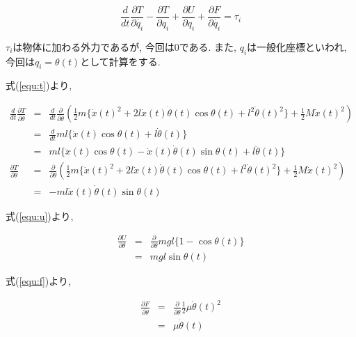 \documentclass[titlepage]{jsarticle}
\begin{document}
        \begin{equation}
            \frac{d}{dt}\frac{\partial T}{\partial \dot{q_i}} - \frac{\partial T}{\partial q_i} + \frac{\partial U}{\partial q_i} + \frac{\partial F}{\partial \dot{q_i}} = \tau _i \label{equ:lag}
        \end{equation}
    
        $\tau _i$は物体に加わる外力であるが, 今回は0である.
        また, $q_i$は一般化座標といわれ, 今回は$q_i = \theta(t)$として計算をする.

        式(\ref{equ:t})より,

        \begin{eqnarray}
            \frac{d}{dt}\frac{\partial T}{\partial \dot{\theta}} &=& \frac{d}{dt}\frac{\partial}{\partial \dot{\theta}} \left(\frac{1}{2} m \{\dot{x}(t)^2 + 2 l \dot{x}(t)\dot{\theta}(t)\cos{\theta(t)} + l^2 \dot{\theta}(t)^2\} + \frac{1}{2}M\dot{x}(t)^2\right) \nonumber \\
            &=& \frac{d}{dt} ml\{\dot{x}(t)\cos{\theta(t)} + l\dot{\theta}(t)\} \nonumber \\
            &=& ml\{\ddot{x}(t)\cos{\theta(t)} - \dot{x}(t)\dot{\theta}(t)\sin{\theta(t)} + l\ddot{\theta}(t)\} \label{equ:ddt} \\
            \frac{\partial T}{\partial \theta} &=& \frac{\partial}{\partial \theta} \left(\frac{1}{2} m \{\dot{x}(t)^2 + 2 l \dot{x}(t)\dot{\theta}(t)\cos{\theta(t)} + l^2 \dot{\theta}(t)^2\} + \frac{1}{2}M\dot{x}(t)^2\right) \nonumber \\
            &=& -ml\dot{x}(t)\dot{\theta}(t)\sin{\theta(t)} \label{equ:dt}
        \end{eqnarray}

        式(\ref{equ:u})より,

        \begin{eqnarray}
            \frac{\partial U}{\partial \theta} &=& \frac{\partial}{\partial \theta} mgl\{1-\cos{\theta(t)}\} \nonumber \\
            &=& mgl\sin{\theta(t)} \label{equ:du}
        \end{eqnarray}

        式(\ref{equ:f})より,

        \begin{eqnarray}
            \frac{\partial F}{\partial \dot{\theta}} &=& \frac{\partial}{\partial \dot{\theta}} \frac{1}{2} \mu \dot{\theta}(t)^2 \nonumber \\
            &=& \mu \dot{\theta}(t) \label{equ:df}
        \end{eqnarray}
\end{document}
